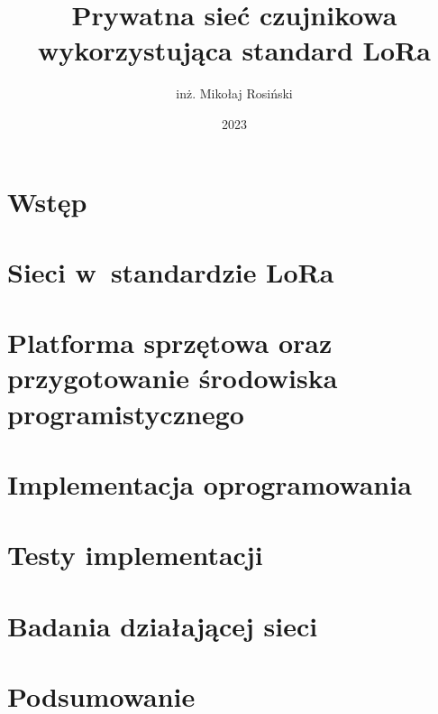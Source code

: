 \documentclass[thesis=mgr,faculty=ee]{EE-dyplom}
\title{Prywatna sieć czujnikowa wykorzystująca standard LoRa}
\author{inż. Mikołaj Rosiński}
\date{2023}
\begin{document}
\frontpages

\chapter{Wstęp}


\chapter{\label{ch:theory}Sieci w~standardzie LoRa}


\chapter{\label{ch:development}Platforma sprzętowa oraz przygotowanie środowiska programistycznego}


\chapter{\label{ch:implementation}Implementacja oprogramowania}


\chapter{\label{ch:testing}Testy implementacji}


\chapter{\label{ch:research}Badania działającej sieci}


\chapter{\label{ch:summary}Podsumowanie}


\bibliografia

\listoffigures
\listoftables
\end{document}
